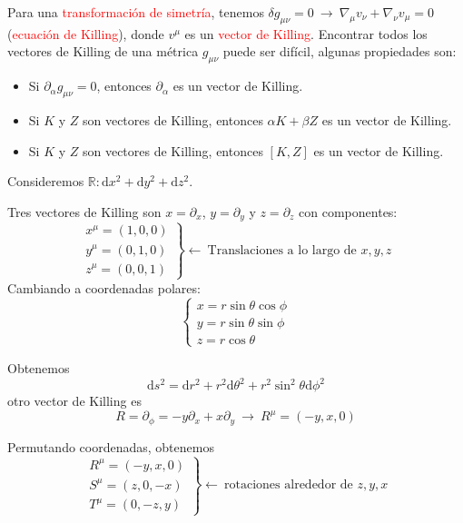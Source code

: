 \documentclass[../main]{subfiles}
\begin{document}
\begin{adjustwidth}{0pt}{-100pt}
Para una \textcolor{red}{transformación de simetría}, tenemos $\delta g_{\mu\nu}=0 \ \rightarrow \ \nabla_{\mu} v_{\nu}+\nabla_{\nu} v_{\mu}=0$ (\textcolor{red}{ecuación de Killing}), donde $v^{\mu}$ es un \textcolor{red}{vector de Killing}. Encontrar todos los vectores de Killing de una métrica $g_{\mu\nu}$ puede ser difícil, algunas propiedades son:
\begin{itemize}
    \item Si $\partial_{\alpha} g_{\mu\nu}=0$, entonces $\partial_{\alpha}$ es un vector de Killing.
    \item Si $K$ y $Z$ son vectores de Killing, entonces $\alpha K+\beta Z$ es un vector de Killing.
    \item Si $K$ y $Z$ son vectores de Killing, entonces $[K, Z]$ es un vector de Killing.
\end{itemize}  

\ejemplo{} Consideremos $\mathbb{R}: \mathrm{d}x^2+\mathrm{d}y^2+\mathrm{d}z^2$.

Tres vectores de Killing son $x=\partial_x$, $y=\partial_y$ y $z=\partial_z$ con componentes:
\begin{equation}
    \left.
    \begin{array}{c}
        x^{\mu}=(1, 0, 0)\\
        y^{\mu}=(0, 1, 0)\\
        z^{\mu}=(0, 0, 1)
    \end{array}
    \right\}
    \leftarrow \ \text{Translaciones a lo largo de } x, y, z
\end{equation}
Cambiando a coordenadas polares:
\begin{equation}
    \left\{
    \begin{array}{c}
        x= r\sin \theta \cos \phi \\
        y= r\sin \theta \sin \phi \\
        z= r\cos \theta
    \end{array}
    \right.
\end{equation}

Obtenemos 
\begin{equation}
    \mathrm{d}s^2=\mathrm{d}r^2+r^2\mathrm{d}\theta^2+r^2\sin^2 \theta \mathrm{d}\phi^2
\end{equation}
otro vector de Killing es 
\begin{equation}
    R=\partial_{\phi}=-y\partial_x+x\partial_y \ \rightarrow \ R^{\mu}=(-y, x, 0)
\end{equation}

Permutando coordenadas, obtenemos 
\begin{equation}
    \left.
    \begin{array}{c}
        R^{\mu}=(-y, x, 0)\\
        S^{\mu}=(z, 0, -x)\\
        T^{\mu}=(0, -z, y)
    \end{array}
    \right\}
    \leftarrow \ \text{rotaciones alrededor de } z, y, x
\end{equation}


\end{adjustwidth}
\end{document}
